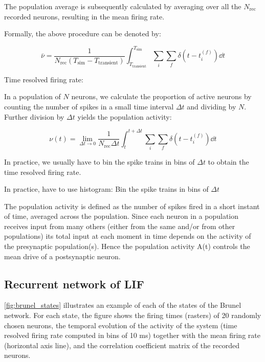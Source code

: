 The population average is subsequently calculated by averaging over all the $N_\mathrm{rec}$ recorded neurons, resulting in the mean firing rate.  

Formally, the above procedure can be denoted by: 

\begin{equation}
    \bar{\nu} = \frac{1}{N_\mathrm{rec} \left(T_\mathrm{sim} - T_\mathrm{transient}\right)} \int_{T_\mathrm{transient}}^{T_\mathrm{sim}} \sum_i \sum_f \delta \left(t - t_i^{(f)} \right) \dd{t}
\end{equation}

Time resolved firing rate: 

In a population of $N$ neurons, we calculate the proportion of active neurons by counting the number of spikes in a small time interval $\Delta t$ and dividing by $N$. Further division by $\Delta t$ yields the population activity:

\begin{equation}
    \nu (t) = \lim_{\Delta t \to 0} \frac{1}{N_\mathrm{rec} \Delta t} \int_{t}^{t + \Delta t} \sum_i \sum_f \delta \left(t - t_i^{(f)} \right) \dd{t}
\end{equation} 

In practice, we usually have to bin the spike trains in bins of $\Delta t$ to obtain the time resolved firing rate. 

In practice, have to use histogram: Bin the spike trains in bins of $\Delta t$


The population activity is defined as the number of spikes fired in a short instant of time, averaged across the population. Since each neuron in a population receives input from many others (either from the same and/or from other populations) its total input at each moment in time depends on the activity of the presynaptic population(s). Hence the population activity A(t) controls the mean drive of a postsynaptic neuron.

\subsection{Recurrent network of LIF}


\autoref{fig:brunel_states} illustrates an example of each of the states of the Brunel network. For each state, the figure shows the firing times (rasters) of 20 randomly chosen neurons, the temporal evolution of the activity of the system (time resolved firing rate computed in bins of 10 ms) together with the mean firing rate (horizontal axis line), and the correlation coefficient matrix of the recorded neurons.


